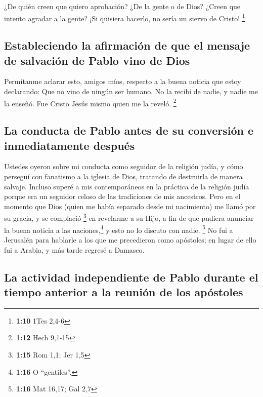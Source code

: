  ¿De quién creen que quiero aprobación? ¿De la gente o de
Dios? ¿Creen que intento agradar a la gente? ¡Si quisiera hacerlo, no
sería un siervo de Cristo! \footnote{\textbf{1:10} 1Tes 2,4-6}

\hypertarget{estableciendo-la-afirmaciuxf3n-de-que-el-mensaje-de-salvaciuxf3n-de-pablo-vino-de-dios}{%
\subsection{Estableciendo la afirmación de que el mensaje de salvación
de Pablo vino de
Dios}\label{estableciendo-la-afirmaciuxf3n-de-que-el-mensaje-de-salvaciuxf3n-de-pablo-vino-de-dios}}

 Permítanme aclarar esto, amigos míos, respecto a la
buena noticia que estoy declarando: Que no vino de ningún ser humano.
 No la recibí de nadie, y nadie me la enseñó. Fue Cristo
Jesús mismo quien me la reveló. \footnote{\textbf{1:12} Hech 9,1-15}

\hypertarget{la-conducta-de-pablo-antes-de-su-conversiuxf3n-e-inmediatamente-despuuxe9s}{%
\subsection{La conducta de Pablo antes de su conversión e inmediatamente
después}\label{la-conducta-de-pablo-antes-de-su-conversiuxf3n-e-inmediatamente-despuuxe9s}}

 Ustedes oyeron sobre mi conducta como seguidor de la
religión judía, y cómo perseguí con fanatismo a la iglesia de Dios,
tratando de destruirla de manera salvaje.  Incluso superé
a mis contemporáneos en la práctica de la religión judía porque era un
seguidor celoso de las tradiciones de mis ancestros. 
Pero en el momento que Dios (quien me había separado desde mi
nacimiento) me llamó por su gracia, y se complació \footnote{\textbf{1:15}
  Rom 1,1; Jer 1,5}  en revelarme a su Hijo, a fin de que
pudiera anunciar la buena noticia a las naciones,\footnote{\textbf{1:16}
  O ``gentiles''.} y esto no lo discuto con nadie. \footnote{\textbf{1:16}
  Mat 16,17; Gal 2,7}  No fui a Jerusalén para hablarle a
los que me precedieron como apóstoles; en lugar de ello fui a Arabia, y
más tarde regresé a Damasco.

\hypertarget{la-actividad-independiente-de-pablo-durante-el-tiempo-anterior-a-la-reuniuxf3n-de-los-apuxf3stoles}{%
\subsection{La actividad independiente de Pablo durante el tiempo
anterior a la reunión de los
apóstoles}\label{la-actividad-independiente-de-pablo-durante-el-tiempo-anterior-a-la-reuniuxf3n-de-los-apuxf3stoles}}

